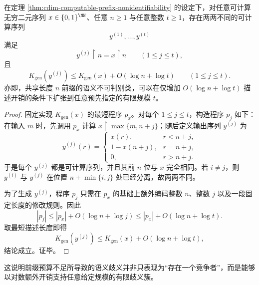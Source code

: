 \begin{theorem}[有限前缀不可判别性的任意有限多重化]\label{thm:cdim-computable-prefix-nonidentifiability-multiplicity}
在定理 \ref{thm:cdim-computable-prefix-nonidentifiability} 的设定下，对任意可计算无穷二元序列 \(x\in\{0,1\}^{\NN}\)、任意 \(n\ge 1\) 与任意整数 \(t\ge 1\)，存在两两不同的可计算序列
\[
y^{(1)},\dots,y^{(t)}
\]
满足
\[
y^{(j)}\upharpoonright n=x\upharpoonright n
\qquad
(1\le j\le t),
\]
且
\[
K_{\mathrm{gen}}(y^{(j)})
\le
K_{\mathrm{gen}}(x)+O(\log n+\log t)
\qquad
(1\le j\le t).
\]
亦即，共享长度 \(n\) 前缀的语义不可判别类，可以在仅增加 \(O(\log n+\log t)\) 描述开销的条件下扩张到任意预先指定的有限规模 \(t\)。
\end{theorem}
\begin{proof}
固定实现 \(K_{\mathrm{gen}}(x)\) 的最短程序 \(p_x\)。对每个 \(1\le j\le t\)，构造程序 \(p_j\) 如下：在输入 \(m\) 时，先调用 \(p_x\) 计算 \(x\upharpoonright \max\{m,n+j\}\)；随后定义输出序列 \(y^{(j)}\) 为
\[
y^{(j)}(r)=
\begin{cases}
x(r),& r<n+j,\\
1-x(n+j),& r=n+j,\\
0,& r>n+j.
\end{cases}
\]
于是每个 \(y^{(j)}\) 都是可计算序列，并且其前 \(n\) 位与 \(x\) 完全相同。若 \(i\neq j\)，则 \(y^{(i)}\) 与 \(y^{(j)}\) 在位置 \(n+\min\{i,j\}\) 处已经分离，故两两不同。
\par
为了生成 \(y^{(j)}\)，程序 \(p_j\) 只需在 \(p_x\) 的基础上额外编码整数 \(n\)、整数 \(j\) 以及一段固定长度的修改规则。因此
\[
|p_j|
\le
|p_x|+O(\log n+\log j)
\le
|p_x|+O(\log n+\log t).
\]
取最短描述长度即得
\[
K_{\mathrm{gen}}(y^{(j)})
\le
K_{\mathrm{gen}}(x)+O(\log n+\log t),
\]
结论成立。证毕。
\end{proof}
这说明前缀预算不足所导致的语义歧义并非只表现为“存在一个竞争者”，而是能够以对数额外开销支持任意给定规模的有限歧义簇。

